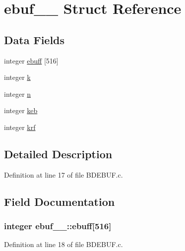 \hypertarget{structebuf__1__}{}\section{ebuf\+\_\+\_\+ Struct Reference}
\label{structebuf__1__}
\subsection*{Data Fields}
\begin{DoxyCompactItemize}
\item 
integer \hyperlink{structebuf__1___ad4743143ef0742ced94c631e18ee602e}{ebuff} \mbox{[}516\mbox{]}
\item 
integer \hyperlink{structebuf__1___a875fe82be4f3439c75f7fe6a957cc627}{k}
\item 
integer \hyperlink{structebuf__1___a414af32eb93e84eacea28886c1eb0093}{n}
\item 
integer \hyperlink{structebuf__1___a252e20996ef31e6f6d45c39d989cd92e}{keb}
\item 
integer \hyperlink{structebuf__1___a22af4603b3dc6305472541a0cf3ace7f}{krf}
\end{DoxyCompactItemize}


\subsection{Detailed Description}


Definition at line 17 of file B\+D\+E\+B\+U\+F.\+c.



\subsection{Field Documentation}
\subsubsection[{\texorpdfstring{ebuff}{ebuff}}]{\setlength{\rightskip}{0pt plus 5cm}integer ebuf\+\_\+\_\+\+::ebuff\mbox{[}516\mbox{]}}\hypertarget{structebuf__1___ad4743143ef0742ced94c631e18ee602e}{}\label{structebuf__1___ad4743143ef0742ced94c631e18ee602e}


Definition at line 18 of file B\+D\+E\+B\+U\+F.\+c.

